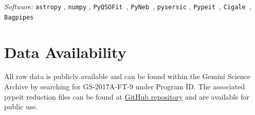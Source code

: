 \documentclass[twocolumn,tight,times,linenumbers]{aastex631}
\newcommand{\pypeit}{\texttt{Pypeit}}
\newcommand{\pyqsofit}{\texttt{PyQSOFit}}
\newcommand{\pyneb}{\texttt{PyNeb}}
\newcommand{\cigale}{\texttt{Cigale}}
\newcommand{\bagpipes}{\texttt{Bagpipes}}
\begin{document}
		\textit{Software:} \texttt{astropy} \citep{astropy:2013,astropy:2018,astropy:2022}, \texttt{numpy} \citep{harris2020array}, \pyqsofit~\citep{Guo2018,Shen2019}, \pyneb~\citep{Luridiana2015}, \texttt{pysersic} \citep{Pasha2023}, \pypeit~\citep{Prochaska2020, Prochaska_zenodo}, \cigale~\citep{Boquien2019,Yang2022}, \bagpipes~\citep{Carnall2018}
		
		
		
		\section*{Data Availability}
		
		All raw data is publicly available and can be found within the Gemini Science Archive by searching for GS-2017A-FT-9 under Program ID. The associated pypeit reduction files can be found at \href{https://github.com/akhostov/EELG1002}{GitHub repository} and are available for public use.
		
		
\end{document}
